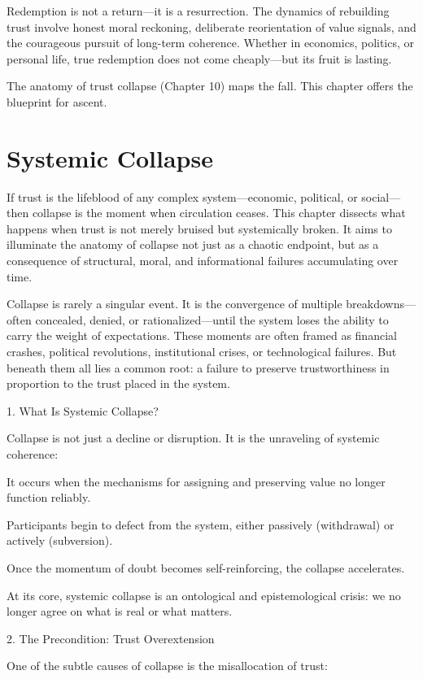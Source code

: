 \documentclass[11pt,oneside]{book}
\begin{document}
Redemption is not a return—it is a resurrection. The dynamics of rebuilding trust involve honest moral reckoning, deliberate reorientation of value signals, and the courageous pursuit of long-term coherence. Whether in economics, politics, or personal life, true redemption does not come cheaply—but its fruit is lasting.

The anatomy of trust collapse (Chapter 10) maps the fall. This chapter offers the blueprint for ascent.


\chapter{Systemic Collapse}

If trust is the lifeblood of any complex system—economic, political, or social—then collapse is the moment when circulation ceases. This chapter dissects what happens when trust is not merely bruised but systemically broken. It aims to illuminate the anatomy of collapse not just as a chaotic endpoint, but as a consequence of structural, moral, and informational failures accumulating over time.

Collapse is rarely a singular event. It is the convergence of multiple breakdowns—often concealed, denied, or rationalized—until the system loses the ability to carry the weight of expectations. These moments are often framed as financial crashes, political revolutions, institutional crises, or technological failures. But beneath them all lies a common root: a failure to preserve trustworthiness in proportion to the trust placed in the system.

1. What Is Systemic Collapse?


Collapse is not just a decline or disruption. It is the unraveling of systemic coherence:

    It occurs when the mechanisms for assigning and preserving value no longer function reliably.

    Participants begin to defect from the system, either passively (withdrawal) or actively (subversion).

    Once the momentum of doubt becomes self-reinforcing, the collapse accelerates.

At its core, systemic collapse is an ontological and epistemological crisis: we no longer agree on what is real or what matters.

2. The Precondition: Trust Overextension


One of the subtle causes of collapse is the misallocation of trust:
\end{document}
